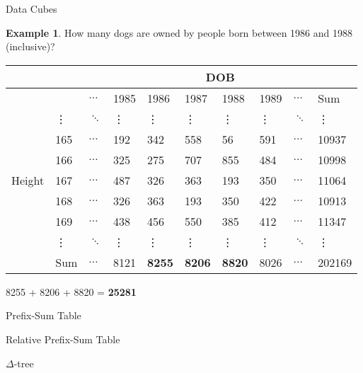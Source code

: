 \documentclass{beamer}
\theoremstyle{definition}
\newtheorem{myexample}{Example}
\theoremstyle{definition}
\begin{document}
\begin{frame}{Data Cubes}
    \begin{myexample}
        How many dogs are owned by people born between 1986 and 1988 (inclusive)?
    \end{myexample}

    \begin{table}[h]\footnotesize
        \begin{tabular} { | l | l | l | l | l | l | l | l | l | l |}
        \hline
        & & \multicolumn{8}{|c|}{DOB} \\ \hline
        & & $\hdots$ & 1985 & 1986 & 1987 & 1988 & 1989 & $\hdots$ & Sum \\ \hline
        \multirow{7}{*}{Height}
        & \vdots & $\ddots$ & \vdots & \vdots & \vdots & \vdots & \vdots & $\ddots$ & \vdots \\
        & 165 & $\hdots$ & 192 & 342 & 558 & 56 & 591 & $\hdots$ & 10937 \\
        & 166 & $\hdots$ & 325 & 275 & 707 & 855 & 484 & $\hdots$ & 10998 \\
        & 167 & $\hdots$ & 487 & 326 & 363 & 193 & 350 & $\hdots$ & 11064 \\
        & 168 & $\hdots$ & 326 & 363 & 193 & 350 & 422 & $\hdots$ & 10913 \\
        & 169 & $\hdots$ & 438 & 456 & 550 & 385 & 412 & $\hdots$ & 11347 \\
        & \vdots & $\ddots$ & \vdots & \vdots & \vdots & \vdots & \vdots & $\ddots$ & \vdots \\
        & Sum & $\hdots$ & 8121 & \textbf{8255} & \textbf{8206} & \textbf{8820} & 8026 & $\hdots$ & 202169 \\
        \hline
        \end{tabular}
    \end{table}
    8255 + 8206 + 8820 = \textbf{25281}
\end{frame}

\begin{frame}{Prefix-Sum Table}

\end{frame}

\begin{frame}{Relative Prefix-Sum Table}

\end{frame}

\begin{frame}{$\Delta$-tree}

\end{frame}
\end{document}
